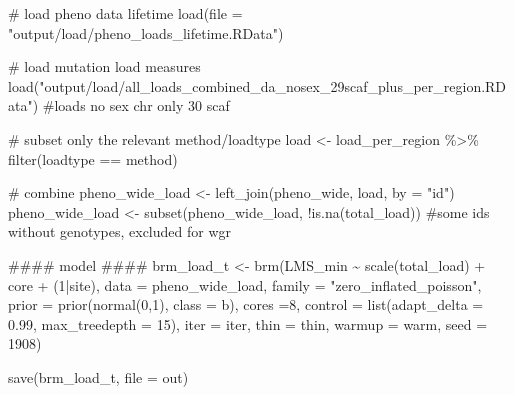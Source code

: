 \documentclass[
  letterpaper,
  DIV=11,
  numbers=noendperiod]{scrreprt}
\newenvironment{Shaded}{}{}
\newcommand{\AttributeTok}[1]{\textcolor[rgb]{0.84,0.23,0.29}{#1}}
\newcommand{\CommentTok}[1]{\textcolor[rgb]{0.42,0.45,0.49}{#1}}
\newcommand{\DecValTok}[1]{\textcolor[rgb]{0.00,0.36,0.77}{#1}}
\newcommand{\DocumentationTok}[1]{\textcolor[rgb]{0.42,0.45,0.49}{#1}}
\newcommand{\FloatTok}[1]{\textcolor[rgb]{0.00,0.36,0.77}{#1}}
\newcommand{\FunctionTok}[1]{\textcolor[rgb]{0.44,0.26,0.76}{#1}}
\newcommand{\NormalTok}[1]{\textcolor[rgb]{0.14,0.16,0.18}{#1}}
\newcommand{\OtherTok}[1]{\textcolor[rgb]{0.44,0.26,0.76}{#1}}
\newcommand{\SpecialCharTok}[1]{\textcolor[rgb]{0.00,0.36,0.77}{#1}}
\newcommand{\StringTok}[1]{\textcolor[rgb]{0.01,0.18,0.38}{#1}}
\begin{document}
\begin{Shaded}
\begin{Highlighting}[]
\CommentTok{\# load pheno data lifetime}
\FunctionTok{load}\NormalTok{(}\AttributeTok{file =} \StringTok{"output/load/pheno\_loads\_lifetime.RData"}\NormalTok{)}

\CommentTok{\# load mutation load measures}
\FunctionTok{load}\NormalTok{(}\StringTok{"output/load/all\_loads\_combined\_da\_nosex\_29scaf\_plus\_per\_region.RData"}\NormalTok{) }\CommentTok{\#loads no sex chr only 30 scaf}

\CommentTok{\# subset only the relevant method/loadtype}
\NormalTok{load }\OtherTok{\textless{}{-}}\NormalTok{ load\_per\_region }\SpecialCharTok{\%\textgreater{}\%} \FunctionTok{filter}\NormalTok{(loadtype }\SpecialCharTok{==}\NormalTok{ method)}

\CommentTok{\# combine}
\NormalTok{pheno\_wide\_load }\OtherTok{\textless{}{-}} \FunctionTok{left\_join}\NormalTok{(pheno\_wide, load, }\AttributeTok{by =} \StringTok{"id"}\NormalTok{)}
\NormalTok{pheno\_wide\_load }\OtherTok{\textless{}{-}} \FunctionTok{subset}\NormalTok{(pheno\_wide\_load, }\SpecialCharTok{!}\FunctionTok{is.na}\NormalTok{(total\_load)) }\CommentTok{\#some ids without genotypes, excluded for wgr}

\DocumentationTok{\#\#\#\# model \#\#\#\#}
\NormalTok{brm\_load\_t }\OtherTok{\textless{}{-}} \FunctionTok{brm}\NormalTok{(LMS\_min }\SpecialCharTok{\textasciitilde{}} \FunctionTok{scale}\NormalTok{(total\_load) }\SpecialCharTok{+}\NormalTok{ core }\SpecialCharTok{+}\NormalTok{ (}\DecValTok{1}\SpecialCharTok{|}\NormalTok{site), }\AttributeTok{data =}\NormalTok{ pheno\_wide\_load,}
                  \AttributeTok{family =} \StringTok{"zero\_inflated\_poisson"}\NormalTok{,}
                  \AttributeTok{prior =} \FunctionTok{prior}\NormalTok{(}\FunctionTok{normal}\NormalTok{(}\DecValTok{0}\NormalTok{,}\DecValTok{1}\NormalTok{), }\AttributeTok{class =}\NormalTok{ b),}
                  \AttributeTok{cores =}\DecValTok{8}\NormalTok{, }\AttributeTok{control =} \FunctionTok{list}\NormalTok{(}\AttributeTok{adapt\_delta =} \FloatTok{0.99}\NormalTok{, }\AttributeTok{max\_treedepth =} \DecValTok{15}\NormalTok{),}
                  \AttributeTok{iter =}\NormalTok{ iter, }\AttributeTok{thin =}\NormalTok{ thin, }\AttributeTok{warmup =}\NormalTok{ warm, }\AttributeTok{seed =} \DecValTok{1908}\NormalTok{)}

\FunctionTok{save}\NormalTok{(brm\_load\_t, }\AttributeTok{file =}\NormalTok{ out)}
\end{Highlighting}
\end{Shaded}
\end{document}

